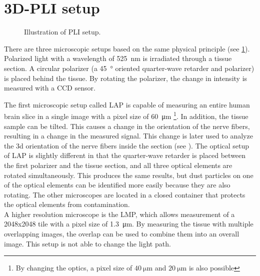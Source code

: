 \section{3D-PLI setup}\label{sec:expSetup}
%
\begin{figure}[!t]
    \captionsetup[sub]{position=top}
    \setlength{\tikzwidth}{\textwidth}
	\centering
	\caption{Illustration of PLI setup.}
	\label{fig:pli_setup}
\end{figure}
%
There are three microscopic setups based on the same physical principle \cite{Axer2011} (see \cref{fig:pli_setup}).
Polarized light with a wavelength of \SI{525}{\nano\meter} is irradiated through a tissue section.
A circular polarizer (a \SI{45}{\degree} oriented quarter-wave retarder and polarizer) is placed behind the tissue.
By rotating the polarizer, the change in intensity is measured with a \ac{CCD} sensor.
\par
% 
The first microscopic setup called \ac{LAP} is capable of measuring an entire human brain slice in a single image with a pixel size of \SI{60}{\micro\meter} \footnote{By changing the optics, a pixel size of $\SI{40}{\micro\meter}$ and $\SI{20}{\micro\meter}$ is also possible}.
In addition, the tissue sample can be tilted.
This causes a change in the orientation of the nerve fibers, resulting in a change in the measured signal.
This change is later used to analyze the 3d orientation of the nerve fibers inside the section (see \dummy{}).
The optical setup of \ac{LAP} is slightly different in that the quarter-wave retarder is placed between the first polarizer and the tissue section, and all three optical elements are rotated simultaneously.
This produces the same results, but dust particles on one of the optical elements can be identified more easily because they are also rotating.
The other microscopes are located in a closed container that protects the optical elements from contamination.
\\
A higher resolution microscope is the \ac{LMP}, which allows measurement of a 2048x2048 tile with a pixel size of \SI{1.3}{\micro\meter}.
By measuring the tissue with multiple overlapping images, the overlap can be used to combine them into an overall image.
This setup is not able to change the light path.
